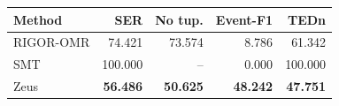 \begin{center}
\begin{minipage}{\columnwidth}
\label{tab:strict}
\centering
\small
\setlength{\tabcolsep}{4pt}
\begin{tabular}{lrrrr}
\toprule
Method & SER & No tup. & Event-F1 & TEDn \\
\midrule
RIGOR-OMR & 74.421 & 73.574 & 8.786 & 61.342 \\
SMT & 100.000 & -- & 0.000 & 100.000 \\
Zeus & \textbf{56.486} & \textbf{50.625} & \textbf{48.242} & \textbf{47.751} \\
\bottomrule
\end{tabular}
\end{minipage}
\end{center}
